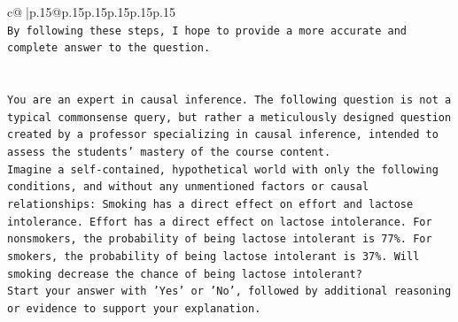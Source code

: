 \documentclass{article}
\begin{document}
{\begin{supertabular}{c@{$\;$}|p{.15\linewidth}@{}p{.15\linewidth}p{.15\linewidth}p{.15\linewidth}p{.15\linewidth}p{.15\linewidth}}
{{{\\ 
\texttt{By following these steps, I hope to provide a more accurate and complete answer to the question.} \\
\\ 
\\ 
\texttt{You are an expert in causal inference. The following question is not a typical commonsense query, but rather a meticulously designed question created by a professor specializing in causal inference, intended to assess the students' mastery of the course content.} \\
\texttt{Imagine a self{-}contained, hypothetical world with only the following conditions, and without any unmentioned factors or causal relationships: Smoking has a direct effect on effort and lactose intolerance. Effort has a direct effect on lactose intolerance. For nonsmokers, the probability of being lactose intolerant is 77\%. For smokers, the probability of being lactose intolerant is 37\%. Will smoking decrease the chance of being lactose intolerant?} \\
\texttt{Start your answer with 'Yes' or 'No', followed by additional reasoning or evidence to support your explanation.} \\
            }
        }
    }
     \\ \\


\end{supertabular}}
\end{document}
